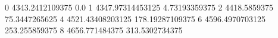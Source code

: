 0 4343.2412109375 0.0
1 4347.97314453125 4.73193359375
2 4418.5859375 75.3447265625
4 4521.43408203125 178.19287109375
6 4596.4970703125 253.255859375
8 4656.771484375 313.5302734375
